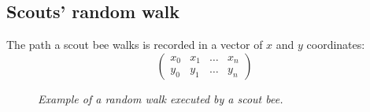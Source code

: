 \documentclass[
	paper=128mm:96mm,
	fontsize=11pt,
	pagesize,
	parskip=half-,
]{scrartcl}
\theoremstyle{mythmstyle} %
\begin{document}
\subsection*{Scouts' random walk}
	The path a scout bee walks is recorded in a vector of $x$ and $y$ coordinates:
	\[\begin{pmatrix}
		x_0 & x_1 & \ldots & x_n \\ y_0 & y_1 & \ldots & y_n
	\end{pmatrix}\]
	\begin{figure}[H]
		\centering
		\caption{\textit{Example of a random walk executed by a scout bee.}}
	\end{figure}
	\clearpage
\end{document}
